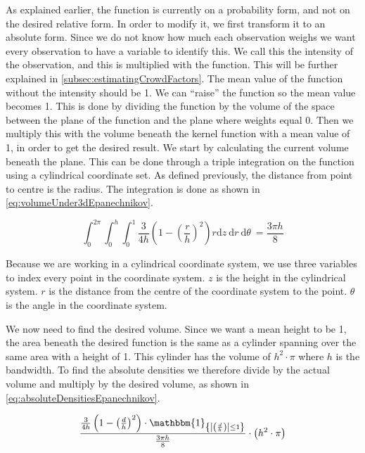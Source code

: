 As explained earlier, the function is currently on a probability form, and not on the desired relative form. In order to modify it, we first transform it to an absolute form. Since we do not know how much each observation weighs we want every observation to have a variable to identify this. We call this the intensity of the observation, and this is multiplied with the function. This will be further explained in \cref{subsec:estimatingCrowdFactors}. The mean value of the function without the intensity should be 1. We can \enquote{raise} the function so the mean value becomes 1. This is done by dividing the function by the volume of the space between the plane of the function and the plane where weights equal $0$. Then we multiply this with the volume beneath the kernel function with a mean value of 1, in order to get the desired result. We start by calculating the current volume beneath the plane. This can be done through a triple integration on the function using a cylindrical coordinate set. As defined previously, the distance from point to centre is the radius. The integration is done as shown in \cref{eq:volumeUnder3dEpanechnikov}.

\begin{equation}
\label{eq:volumeUnder3dEpanechnikov}
\int_0^{2 \pi} \int_0^h \int_0^1 \frac{3}{4 h} \left(1 - \left(\frac{r}{h}\right)^2\right) r \mathrm{ d}z\ \mathrm{d}r\ \mathrm{d}\theta\ = \frac{3 \pi h}{8}
\end{equation}

Because we are working in a cylindrical coordinate system, we use three variables to index every point in the coordinate system. $z$ is the height in the cylindrical system. $r$ is the distance from the centre of the coordinate system to the point. $\theta$ is the angle in the coordinate system.

We now need to find the desired volume. Since we want a mean height to be 1, the area beneath the desired function is the same as a cylinder spanning over the same area with a height of 1. This cylinder has the volume of $h^2 \cdot \pi$ where $h$ is the bandwidth. To find the absolute densities we therefore divide by the actual volume and multiply by the desired volume, as shown in \cref{eq:absoluteDensitiesEpanechnikov}.

\begin{equation}
\label{eq:absoluteDensitiesEpanechnikov}
\frac{\frac{3}{4 h} \left(1 - \left(\frac{d}{h}\right)^2\right) \cdot \mathbbm{1}_{\left\{\left|\left(\frac{d}{h}\right)\right| \leq 1\right\}}}{\frac{3\pi h}{8}} \cdot \left(h^2 \cdot \pi\right)
\end{equation}

